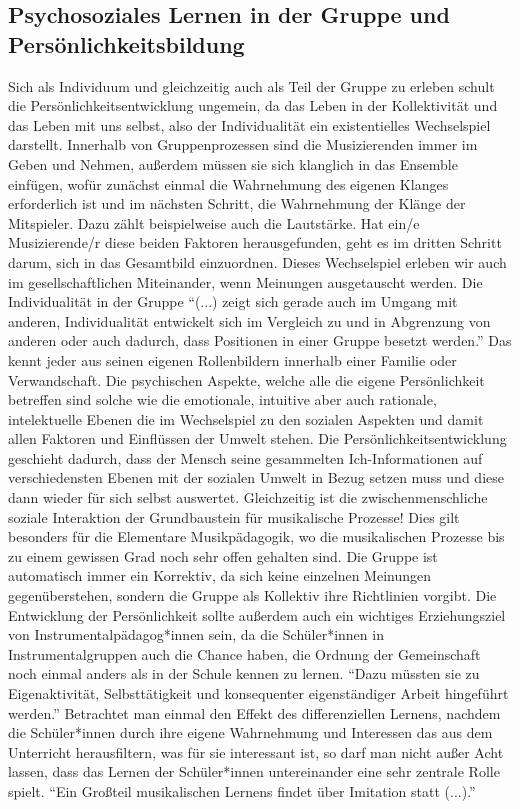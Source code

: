 \subsection{Psychosoziales Lernen in der Gruppe und Persönlichkeitsbildung}
Sich als Individuum und gleichzeitig auch als Teil der Gruppe zu erleben schult
die Persönlichkeitsentwicklung ungemein, da das Leben in der Kollektivität und
das Leben mit uns selbst, also der Individualität ein existentielles
Wechselspiel darstellt. Innerhalb von Gruppenprozessen sind die Musizierenden
immer im Geben und Nehmen, außerdem müssen sie sich klanglich in das Ensemble
einfügen, wofür zunächst einmal die Wahrnehmung des eigenen Klanges erforderlich
ist und im nächsten Schritt, die Wahrnehmung der Klänge der Mitspieler. Dazu
zählt beispielweise auch die Lautstärke. Hat ein/e Musizierende/r diese beiden
Faktoren herausgefunden, geht es im dritten Schritt darum, sich in das
Gesamtbild einzuordnen. Dieses Wechselspiel erleben wir auch im
gesellschaftlichen Miteinander, wenn Meinungen ausgetauscht werden. Die Individualität in der Gruppe \enquote{(...) zeigt sich
gerade auch im Umgang mit anderen, Individualität entwickelt sich im Vergleich
zu und in Abgrenzung von anderen oder auch dadurch, dass Positionen in einer
Gruppe besetzt werden.}\autocite[95]{ribke:emp} Das kennt jeder aus seinen
eigenen Rollenbildern innerhalb einer Familie oder Verwandschaft. Die
psychischen Aspekte, welche alle die eigene Persönlichkeit betreffen sind solche
wie die emotionale, intuitive aber auch rationale, intelektuelle Ebenen die im
Wechselspiel zu den sozialen Aspekten und damit allen Faktoren und Einflüssen
der Umwelt stehen. Die Persönlichkeitsentwicklung geschieht dadurch, dass der
Mensch seine gesammelten Ich-Informationen auf verschiedensten Ebenen mit der
sozialen Umwelt in Bezug setzen muss und diese dann wieder für sich selbst
auswertet. Gleichzeitig ist die zwischenmenschliche soziale Interaktion der
Grundbaustein für musikalische Prozesse! Dies gilt besonders für die Elementare
Musikpädagogik, wo die musikalischen Prozesse bis zu einem gewissen Grad noch
sehr offen gehalten sind. Die Gruppe ist automatisch immer ein Korrektiv, da
sich keine einzelnen Meinungen gegenüberstehen, sondern die Gruppe als Kollektiv
ihre Richtlinien vorgibt. Die Entwicklung der Persönlichkeit sollte außerdem
auch ein wichtiges Erziehungsziel von Instrumentalpädagog*innen sein, da die
Schüler*innen in Instrumentalgruppen auch die Chance haben, die Ordnung der
Gemeinschaft noch einmal anders als in der Schule kennen zu lernen.
\enquote{Dazu müssten sie zu Eigenaktivität, Selbsttätigkeit und konsequenter
eigenständiger Arbeit hingeführt
werden.}\autocite[64]{losert:die_kunst_zu_unterrichten} Betrachtet man einmal
den Effekt des differenziellen Lernens, nachdem die Schüler*innen durch ihre
eigene Wahrnehmung und Interessen das aus dem Unterricht herausfiltern, was für
sie interessant ist, so darf man nicht außer Acht lassen, dass das Lernen der
Schüler*innen untereinander eine sehr zentrale Rolle spielt. \enquote{Ein
Großteil musikalischen Lernens findet über Imitation statt
(...).}\autocite[98]{doerne:umfassend_musizieren}


